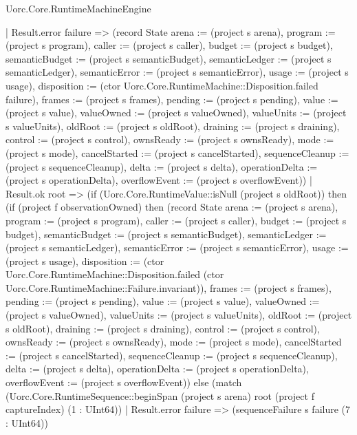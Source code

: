 \begin{lexlean}{Uorc.Core.RuntimeMachineEngine}
\begin{semanticmodule}
{        | Result.error failure => (record State {arena := (project s arena), program := (project s program), caller := (project s caller), budget := (project s budget), semanticBudget := (project s semanticBudget), semanticLedger := (project s semanticLedger), semanticError := (project s semanticError), usage := (project s usage), disposition := (ctor Uorc.Core.RuntimeMachine::Disposition.failed failure), frames := (project s frames), pending := (project s pending), value := (project s value), valueOwned := (project s valueOwned), valueUnits := (project s valueUnits), oldRoot := (project s oldRoot), draining := (project s draining), control := (project s control), ownsReady := (project s ownsReady), mode := (project s mode), cancelStarted := (project s cancelStarted), sequenceCleanup := (project s sequenceCleanup), delta := (project s delta), operationDelta := (project s operationDelta), overflowEvent := (project s overflowEvent)})
        | Result.ok root => (if (Uorc.Core.RuntimeValue::isNull (project s oldRoot)) then (if (project f observationOwned) then (record State {arena := (project s arena), program := (project s program), caller := (project s caller), budget := (project s budget), semanticBudget := (project s semanticBudget), semanticLedger := (project s semanticLedger), semanticError := (project s semanticError), usage := (project s usage), disposition := (ctor Uorc.Core.RuntimeMachine::Disposition.failed (ctor Uorc.Core.RuntimeMachine::Failure.invariant)), frames := (project s frames), pending := (project s pending), value := (project s value), valueOwned := (project s valueOwned), valueUnits := (project s valueUnits), oldRoot := (project s oldRoot), draining := (project s draining), control := (project s control), ownsReady := (project s ownsReady), mode := (project s mode), cancelStarted := (project s cancelStarted), sequenceCleanup := (project s sequenceCleanup), delta := (project s delta), operationDelta := (project s operationDelta), overflowEvent := (project s overflowEvent)}) else (match (Uorc.Core.RuntimeSequence::beginSpan (project s arena) root (project f captureIndex) (1 : UInt64))
          | Result.error failure => (sequenceFailure s failure (7 : UInt64))
}
\end{semanticmodule}
\end{lexlean}
